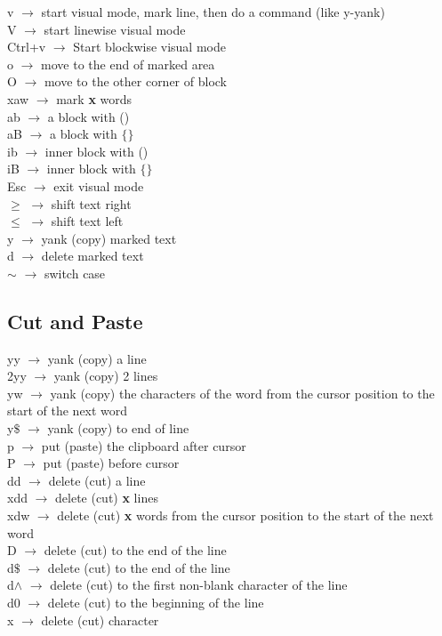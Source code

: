 \documentclass[twoside,a4paper]{article}
\newcommand{\tcc}{\color{cyan}}
\newcommand{\tcr}{\color{red}}
\newcommand{\tck}{\color{black}}
\newcommand{\ra }{$\rightarrow$ }
\begin{document}
\begin{multicols}{2}
    \tcr v \tck \ra start visual mode, mark
    line, then do a command (like y-yank)\\
    \tcr V \tck \ra start linewise visual
    mode\\
    \tcr Ctrl+v \tck \ra Start blockwise
    visual mode\\
    \tcr o \tck \ra move to the end of
    marked area\\
    \tcr O \tck \ra move to the other
    corner of block\\
    \tcr xaw \tck \ra mark \textbf{x}
    words\\
    \tcr ab \tck \ra a block with ()\\
    \tcr aB \tck \ra a block with $\{ \}$\\
    \tcr ib \tck \ra inner block with ()\\
    \tcr iB \tck \ra inner block with
    $\{ \}$\\
    \tcr Esc \tck \ra exit visual mode\\
    \tcr $ \geq $ \tck \ra shift text
    right\\
    \tcr $\leq$ \tck \ra shift text left\\
    \tcr y \tck \ra yank (copy) marked
    text\\
    \tcr d \tck \ra delete marked text\\
    \tcr $\sim$ \tck \ra switch case

    \tcc \subsection{Cut and Paste}

    \tcr yy \tck \ra yank (copy) a line\\
    \tcr 2yy \tck \ra yank (copy) 2 lines\\
    \tcr yw \tck \ra yank (copy) the
    characters of the word from the cursor position to the start of
    the next word\\
    \tcr y$\$$ \tck \ra yank (copy) to end
    of line\\
    \tcr p \tck \ra put (paste) the
    clipboard after cursor\\
    \tcr P \tck \ra put (paste) before
    cursor\\
    \tcr dd \tck \ra delete (cut) a line\\
    \tcr xdd \tck \ra delete (cut)
    \textbf{x} lines\\
    \tcr xdw \tck \ra delete (cut)
    \textbf{x} words from the cursor position to the start of the
    next word\\
    \tcr D \tck \ra delete (cut) to the end
    of the line\\
    \tcr d$\$$ \tck \ra delete (cut) to the
    end of the line\\
    \tcr d$\wedge$ \tck \ra delete (cut)
    to the first non-blank character of the line\\
    \tcr d0 \tck \ra delete (cut) to the
    beginning of the line\\
    \tcr x \tck \ra delete (cut) character


\end{multicols}
\end{document}
